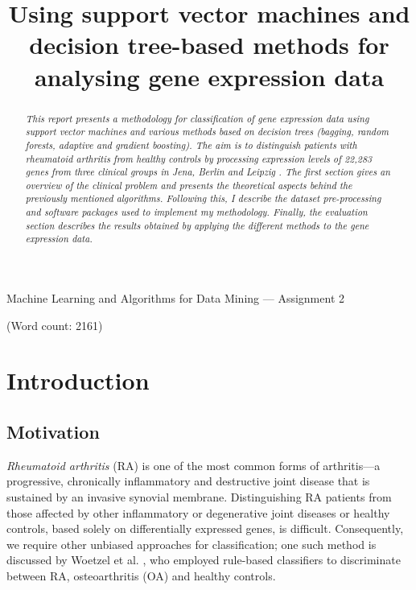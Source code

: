 \documentclass[11pt]{article}
\numberwithin{equation}{section}
\begin{document}
\date{}
\title{\huge \bf{Using support vector machines and\\ decision tree-based methods for\\ analysing gene expression data}}\maketitle
\centerline{\Large {Machine Learning and Algorithms for Data Mining --- Assignment 2}}
\vspace{1em}
\centerline{(Word count: 2161)}
\vspace{2em}

\begin{abstract}
\noindent
\textit{This report presents a methodology for classification of gene expression data using support vector machines and various methods based on decision trees (bagging, random forests, adaptive and gradient boosting). The aim is to distinguish patients with rheumatoid arthritis from healthy controls by processing expression levels of 22,283 genes from three clinical groups in Jena, Berlin and Leipzig \cite{woetzel2014}. The first section gives an overview of the clinical problem and presents the theoretical aspects behind the previously mentioned algorithms. Following this, I describe the dataset pre-processing and software packages used to implement my methodology. Finally, the evaluation section describes the results obtained by applying the different methods to the gene expression data.}
\end{abstract}

\section{Introduction}

\subsection{Motivation}

\textit{Rheumatoid arthritis} (RA) is one of the most common forms of arthritis---a progressive, chronically inflammatory and destructive joint disease that is sustained by an invasive synovial membrane. Distinguishing RA patients from those affected by other inflammatory or degenerative joint diseases or healthy controls, based solely on differentially expressed genes, is difficult. Consequently, we require other unbiased approaches for classification; one such method is discussed by Woetzel et al. \cite{woetzel2014}, who employed rule-based classifiers to discriminate between RA, osteoarthritis (OA) and healthy controls. 
\end{document}
